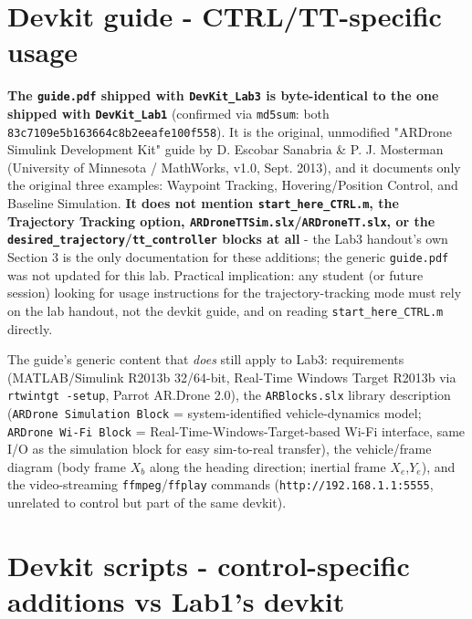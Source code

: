 \documentclass[11pt]{article}
\begin{document}
\section{Devkit guide - CTRL/TT-specific usage}

\textbf{The \texttt{guide.pdf} shipped with \texttt{DevKit\_\allowbreak{}Lab3} is byte-identical to the one shipped with \texttt{DevKit\_\allowbreak{}Lab1}} (confirmed via \texttt{md5sum}: both \texttt{83c7109e5b163664c8b2eeafe100f558}). It is the original, unmodified "ARDrone Simulink Development Kit" guide by D. Escobar Sanabria \& P. J. Mosterman (University of Minnesota / MathWorks, v1.0, Sept. 2013), and it documents only the original three examples: Waypoint Tracking, Hovering/Position Control, and Baseline Simulation. \textbf{It does not mention \texttt{start\_\allowbreak{}here\_\allowbreak{}CTRL.m}, the Trajectory Tracking option, \texttt{ARDroneTTSim.slx}/\texttt{ARDroneTT.slx}, or the \texttt{desired\_\allowbreak{}trajectory}/\texttt{tt\_\allowbreak{}controller} blocks at all} - the Lab3 handout's own Section 3 is the only documentation for these additions; the generic \texttt{guide.pdf} was not updated for this lab. Practical implication: any student (or future session) looking for usage instructions for the trajectory-tracking mode must rely on the lab handout, not the devkit guide, and on reading \texttt{start\_\allowbreak{}here\_\allowbreak{}CTRL.m} directly.

The guide's generic content that \textit{does} still apply to Lab3: requirements (MATLAB/Simulink R2013b 32/64-bit, Real-Time Windows Target R2013b via \texttt{rtwintgt -\allowbreak{}setup}, Parrot AR.Drone 2.0), the \texttt{ARBlocks.slx} library description (\texttt{ARDrone Simulation Block} = system-identified vehicle-dynamics model; \texttt{ARDrone Wi-Fi Block} = Real-Time-Windows-Target-based Wi-Fi interface, same I/O as the simulation block for easy sim-to-real transfer), the vehicle/frame diagram (body frame $X_b$ along the heading direction; inertial frame $X_e$,$Y_e$), and the video-streaming \texttt{ffmpeg}/\texttt{ffplay} commands (\texttt{http://192.168.1.1:5555}, unrelated to control but part of the same devkit).

\section{Devkit scripts - control-specific additions vs Lab1's devkit}
\end{document}
